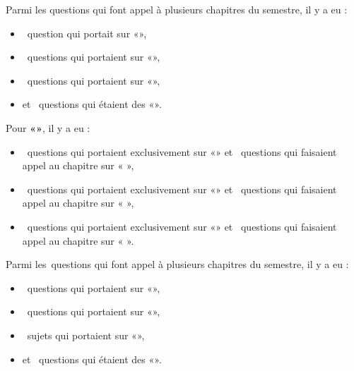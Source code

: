 \vspace*{-14pt}

Parmi les questions qui font appel à plusieurs chapitres du semestre, il y a eu :

\vspace*{-14pt}

\begin{itemize}
\item {}~question qui portait sur «\EXSTA{}»{},
\item {}~questions qui portaient sur «\EXSMM{}»{}, 
\item {}~questions qui portaient sur «{}\ETAMM{}»{}, \item et ~questions qui étaient des «\OdS{}»{}.
\end{itemize}

\vspace*{-14pt}

Pour \textbf{«\HQ{}»{}}, il y a eu :

\vspace*{-14pt}

\begin{itemize}
\item {}~questions qui portaient exclusivement sur «\CC{}»{} et ~questions qui faisaient appel au chapitre sur « \CC{} »{},
\item {}~questions qui portaient exclusivement sur «{}\HV{}»{} et ~questions qui faisaient appel au chapitre sur « \HV{} »{},
\item {}~questions qui portaient exclusivement sur «{}\HL{}»{} et ~questions qui faisaient appel au chapitre sur « \HL{} »{}.
\end{itemize}

\vspace*{-14pt}

Parmi les~questions qui font appel à plusieurs chapitres du semestre, il y a eu :

\vspace*{-14pt}

\begin{itemize}
\item {}~questions qui portaient sur «\HVL{}»{},
\item {}~questions qui portaient sur «\HVCC{}»{},
\item {}~sujets qui portaient sur «\HLCC{}»{},
\item et ~questions qui étaient des «{}\OdH{}»{}.
\end{itemize}

